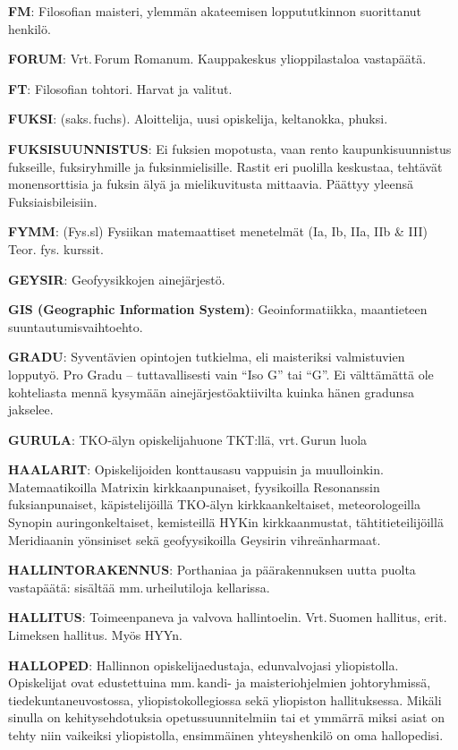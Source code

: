 \documentclass[../ala_hataile.tex]{subfiles}
\begin{document}
\textbf{FM}: Filosofian maisteri, ylemmän akateemisen
loppututkinnon suorittanut henkilö.

\textbf{FORUM}: Vrt.\,Forum Romanum. Kauppakeskus
ylioppilastaloa vastapäätä.

\textbf{FT}: Filosofian tohtori. Harvat ja valitut.

\textbf{FUKSI}: (saks.\,fuchs). Aloittelija, uusi
opiskelija, keltanokka, phuksi.

\textbf{FUKSISUUNNISTUS}: Ei fuksien mopotusta,
vaan rento kaupunkisuunnistus
fukseille, fuksiryhmille ja fuksinmielisille.
Rastit eri puolilla keskustaa, tehtävät monensorttisia
ja fuksin älyä ja mielikuvitusta
mittaavia. Päättyy yleensä Fuksiaisbileisiin.

\textbf{FYMM}: (Fys.sl) Fysiikan matemaattiset
menetelmät (Ia, Ib, IIa, IIb \& III) Teor. fys.
kurssit.

\textbf{GEYSIR}: Geofyysikkojen ainejärjestö.

\textbf{GIS (Geographic Information System)}:
Geoinformatiikka, maantieteen suuntautumisvaihtoehto.

\textbf{GRADU}: Syventävien opintojen tutkielma, eli maisteriksi valmistuvien lopputyö.
Pro Gradu -- tuttavallisesti vain ``Iso G''
tai ``G''. Ei välttämättä ole kohteliasta mennä
kysymään ainejärjestöaktiivilta kuinka
hänen gradunsa jakselee.

\textbf{GURULA}: TKO-älyn opiskelijahuone
TKT:llä, vrt.\,Gurun luola

\textbf{HAALARIT}: Opiskelijoiden konttausasu
vappuisin ja muulloinkin. Matemaatikoilla
Matrixin kirkkaanpunaiset, fyysikoilla Resonanssin
fuksianpunaiset, käpistelijöillä
TKO-älyn kirkkaankeltaiset, meteorologeilla
Synopin auringonkeltaiset, kemisteillä
HYKin kirkkaanmustat, tähtitieteilijöillä Meridiaanin yönsiniset sekä
geofyysikoilla Geysirin vihreänharmaat.

\textbf{HALLINTORAKENNUS}: Porthaniaa ja
päärakennuksen uutta puolta vastapäätä: sisältää
mm.\,urheilutiloja kellarissa.

\textbf{HALLITUS}: Toimeenpaneva ja valvova
hallintoelin. Vrt.\,Suomen hallitus, erit.\,Limeksen
hallitus. Myös HYYn.

\textbf{HALLOPED}: Hallinnon opiskelijaedustaja, edunvalvojasi yliopistolla. Opiskelijat ovat edustettuina mm.\,kandi- ja maisteriohjelmien johtoryhmissä, tiedekuntaneuvostossa, yliopistokollegiossa sekä yliopiston hallituksessa. Mikäli sinulla on kehitysehdotuksia opetussuunnitelmiin tai et ymmärrä miksi asiat on tehty niin vaikeiksi yliopistolla, ensimmäinen yhteyshenkilö on oma hallopedisi.
\end{document}
